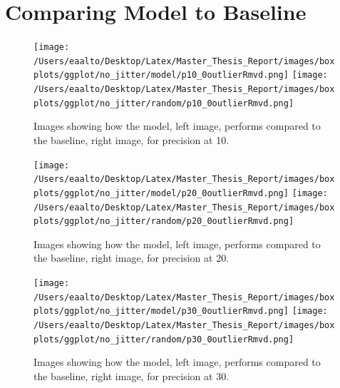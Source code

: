 \documentclass[a4paper,11pt]{kth-mag}
\begin{document}
\section{Comparing Model to Baseline}

\begin{figure}
\centering
\texttt{[image: /Users/eaalto/Desktop/Latex/Master\_Thesis\_Report/images/boxplots/ggplot/no\_jitter/model/p10\_0outlierRmvd.png]}
\texttt{[image: /Users/eaalto/Desktop/Latex/Master\_Thesis\_Report/images/boxplots/ggplot/no\_jitter/random/p10\_0outlierRmvd.png]}
\caption{Images showing how the model, left image, performs compared to the baseline, right image, for precision at 10.}
\label{prec10}
\end{figure}


\begin{figure}
\centering
\texttt{[image: /Users/eaalto/Desktop/Latex/Master\_Thesis\_Report/images/boxplots/ggplot/no\_jitter/model/p20\_0outlierRmvd.png]}
\texttt{[image: /Users/eaalto/Desktop/Latex/Master\_Thesis\_Report/images/boxplots/ggplot/no\_jitter/random/p20\_0outlierRmvd.png]}
\caption{Images showing how the model, left image, performs compared to the baseline, right image, for precision at 20.}
\label{prec20}
\end{figure}

\begin{figure}
\centering
\texttt{[image: /Users/eaalto/Desktop/Latex/Master\_Thesis\_Report/images/boxplots/ggplot/no\_jitter/model/p30\_0outlierRmvd.png]}
\texttt{[image: /Users/eaalto/Desktop/Latex/Master\_Thesis\_Report/images/boxplots/ggplot/no\_jitter/random/p30\_0outlierRmvd.png]}
\caption{Images showing how the model, left image, performs compared to the baseline, right image, for precision at 30.}
\label{prec30}
\end{figure}
\end{document}
